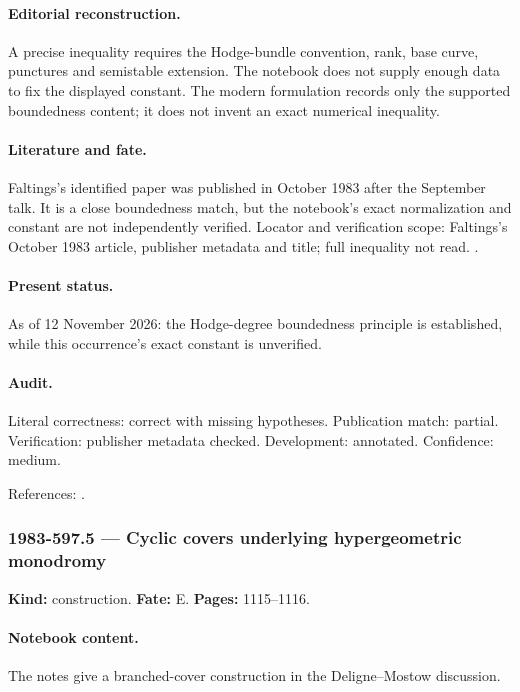\paragraph{Editorial reconstruction.} A precise inequality requires the Hodge-bundle convention, rank, base curve, punctures and semistable extension. The notebook does not supply enough data to fix the displayed constant. The modern formulation records only the supported boundedness content; it does not invent an exact numerical inequality.

\paragraph{Literature and fate.} Faltings's identified paper was published in October 1983 after the September talk. It is a close boundedness match, but the notebook's exact normalization and constant are not independently verified. Locator and verification scope: Faltings's October 1983 article, publisher metadata and title; full inequality not read. \cite{faltings1983arakelov}.

\paragraph{Present status.} As of 12 November 2026: the Hodge-degree boundedness principle is established, while this occurrence's exact constant is unverified.

\paragraph{Audit.} Literal correctness: correct with missing hypotheses. Publication match: partial. Verification: publisher metadata checked. Development: annotated. Confidence: medium.

\noindent References: \citep{faltings1983arakelov}.\par

\subsubsection{1983-597.5 --- Cyclic covers underlying hypergeometric monodromy}

\label{item:1983-597.5}

\noindent\textbf{Kind:} construction. \textbf{Fate:} E. \textbf{Pages:} 1115--1116.\par

\paragraph{Notebook content.} The notes give a branched-cover construction in the Deligne--Mostow discussion.

